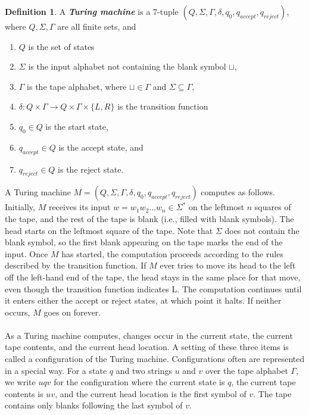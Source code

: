 \documentclass[11pt]{article}
\theoremstyle{definition}
\newtheorem{defn}{Definition}[section]
\begin{document}
\begin{defn}
A \textbf{\textit{Turing machine}} is a 7-tuple $(Q,\Sigma, \Gamma, \delta, q_0, q_{accept},q_{reject})$, where $Q,\Sigma, \Gamma$ are all finite sets, and
\begin{enumerate}
    \item $Q$ is the set of states
    \item $\Sigma$ is the input alphabet not containing the blank symbol $\sqcup$,
    \item $\Gamma$ is the tape alphabet, where $\sqcup\in\Gamma$ and $\Sigma\subseteq\Gamma$,
    \item $\delta:Q\times\Gamma\to Q\times\Gamma\times \{L,R\}$ is the transition function
    \item $q_0\in Q$ is the start state, 
    \item $q_{accept}\in Q$ is the accept state, and 
    \item $q_{reject}\in Q$ is the reject state.
\end{enumerate}
A Turing machine $M = (Q,\Sigma, \Gamma, \delta, q_0, q_{accept},q_{reject})$ computes as follows. Initially, $M$ receives its input $w = w_1w_2\ldots w_n \in\Sigma^*$ on the leftmost $n$ squares of the tape, and the rest of the tape is blank (i.e., filled with blank symbols). The head starts on the leftmost square of the tape. Note that $\Sigma$ does not contain the blank symbol, so the first blank appearing on the tape marks the end of the input. Once $M$ has started, the computation proceeds according to the rules described by the transition function. If $M$ ever tries to move its head to the left off the left-hand end of the tape, the head stays in the same place for that move, even though the transition function indicates L. The computation continues until it enters either the accept or reject states, at which point it halts. If neither occurs, $M$ goes on forever.\\\\
As a Turing machine computes, changes occur in the current state, the current tape contents, and the current head location. A setting of these three items is called a configuration of the Turing machine. Configurations often are represented in a special way. For a state $q$ and two strings $u$ and $v$ over the tape alphabet $\Gamma$, we write $u q v$ for the configuration where the current state is $q$, the current tape contents is $uv$, and the current head location is the first symbol of $v$. The tape contains only blanks following the last symbol of $v$. 
\end{defn}
\end{document}
